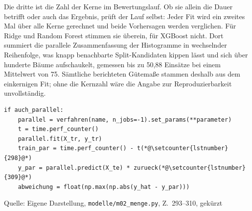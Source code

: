 \documentclass[12pt,a4paper]{article}
\newcommand{\tabquelle}[1][Eigene Darstellung]{%
  \par\setlength{\parskip}{0pt}\vspace{3pt}%
  {\setstretch{1}\fontsize{9pt}{11pt}\selectfont\raggedright Quelle: #1\par}%
}
\begin{document}
Die dritte ist die Zahl der Kerne im Bewertungslauf. Ob sie allein die Dauer
betrifft oder auch das Ergebnis, prüft der
Lauf selbst: Jeder Fit wird ein zweites Mal über alle Kerne gerechnet und beide
Vorhersagen werden verglichen. Für Ridge und Random Forest stimmen sie überein,
für XGBoost nicht. Dort summiert die parallele Zusammenfassung der Histogramme
in wechselnder Reihenfolge, was knapp benachbarte Split-Kandidaten kippen lässt
und sich über hunderte Bäume aufschaukelt, gemessen bis zu 50,88 Einsätze bei
einem Mittelwert von 75. Sämtliche berichteten Gütemaße stammen deshalb aus dem
einkernigen Fit; ohne die Kernzahl wäre die Angabe zur Reproduzierbarkeit
unvollständig.

\begin{quellcode}[htbp]
\caption{Derselbe Fit einkernig und über alle Kerne}
\label{lst:parallel}\vspace{-3.5pt}
\begin{lstlisting}[style=pythonstil,firstnumber=293]
if auch_parallel:
    parallel = verfahren(name, n_jobs=-1).set_params(**parameter)
    t = time.perf_counter()
    parallel.fit(X_tr, y_tr)
    train_par = time.perf_counter() - t(*@\setcounter{lstnumber}{298}@*)
    y_par = parallel.predict(X_te) * zurueck(*@\setcounter{lstnumber}{309}@*)
    abweichung = float(np.max(np.abs(y_hat - y_par)))
\end{lstlisting}
\tabquelle[Eigene Darstellung, \texttt{modelle/m02\_menge.py}, Z.~293--310, gekürzt]
\end{quellcode}
\end{document}
